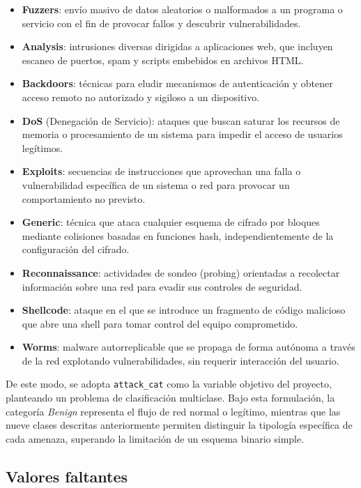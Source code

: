 \documentclass[conference]{IEEEtran}
\begin{document}
\begin{itemize}
    \item \textbf{Fuzzers}: envío masivo de datos aleatorios o  malformados a un programa o servicio con el fin de provocar fallos y descubrir vulnerabilidades.
    \item \textbf{Analysis}: intrusiones diversas dirigidas a aplicaciones web, que incluyen escaneo de puertos, spam y  scripts embebidos en archivos HTML.
    \item \textbf{Backdoors}: técnicas para eludir mecanismos de autenticación y obtener acceso remoto no autorizado y sigiloso a un dispositivo.
    \item \textbf{DoS} (Denegación de Servicio): ataques que buscan saturar los recursos de memoria o procesamiento de un sistema para impedir el acceso de usuarios legítimos.
    \item \textbf{Exploits}: secuencias de instrucciones que aprovechan una falla o vulnerabilidad específica de un sistema o red para provocar un comportamiento no previsto.
    \item \textbf{Generic}: técnica que ataca cualquier esquema de cifrado por bloques mediante colisiones basadas en funciones hash, independientemente de la configuración del cifrado.
    \item \textbf{Reconnaissance}: actividades de sondeo (probing) orientadas a recolectar información sobre una red para evadir sus controles de seguridad.
    \item \textbf{Shellcode}: ataque en el que se introduce un fragmento de código malicioso que abre una shell para tomar control del equipo comprometido.
    \item \textbf{Worms}: malware autorreplicable que se propaga de forma autónoma a través de la red explotando vulnerabilidades, sin requerir interacción del usuario.
\end{itemize}
De este modo, se adopta \texttt{attack\_cat} como la variable objetivo del proyecto, planteando un problema de clasificación multiclase. Bajo esta formulación, la categoría \textit{Benign} representa el flujo de red normal o legítimo, mientras que las nueve clases descritas anteriormente permiten distinguir la tipología específica de cada amenaza, superando la limitación de un esquema binario simple.
\FloatBarrier

\subsection{Valores faltantes}
\end{document}
